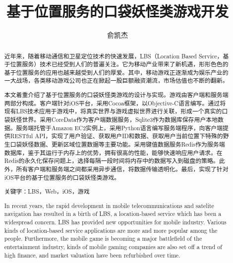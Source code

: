 \documentclass{article}
\title{基于位置服务的口袋妖怪类游戏开发}
\author{俞凯杰}
\begin{document}
\begin{CJK}{UTF8}{gbsn}
  \maketitle

  \renewcommand{\abstractname}{摘要}
	\renewcommand{\figurename}{图}
	\renewcommand{\refname}{参考文献}

	

  \begin{abstract}
    近年来，随着移动通信和卫星定位技术的快速发展，LBS（Location Based Service，基于位置服务）技术已经受到人们的普遍关注。它为移动产业带来了新机遇，形形色色的基于位置服务的应用也越来越受到人们的厚爱。其中，移动游戏正逐渐成为娱乐产业的一大战场，各类移动游戏公司也正在掀起一股巨额融资潮流，市场估值也不断的翻新。

    本文着重介绍了基于位置服务的口袋妖怪类游戏的设计与实现。游戏由客户端和服务端两部分构成。客户端针对iOS平台，采用Cocoa框架，以Objective-C语言编写。通过将现有LBS技术应用于游戏中，将真实世界与游戏虚拟世界进行关联，形成一个真实的口袋妖怪世界。采用CoreData作为客户端数据服务，Sqlite3作为数据库保存用户本地数据。服务端托管于Amazon EC2实例上，采用Python语言编写服务端程序，向客户端提供RESTful API，实现了用户验证、获取用户ID和数据、获取用户当前位置下特殊的野生口袋妖怪数据、更新区域位置数据等主要功能。采用键值数据服务Redis作为服务端数据库，鉴于其运行于内存上的优势，拥有很高的性能，能够快速响应用户请求。在Redis的永久化保存问题上，选择每隔一段时间将内存中的数据写入到磁盘的策略。此外，所有客户端和服务端之间都采用异步通信，将数据传输透明化。最后，实现了针对iOS平台的基于位置服务的口袋妖怪类游戏。

    关键字：LBS，Web，iOS，游戏
    
  \end{abstract}

  \begin{abstract}
    In recent years, the rapid development in mobile telecommunications and satelite navigation has resulted in a birth of LBS, a location-based service which has been a widespread concern. LBS has provided new opportunities for mobile industry. Various kinds of location-based service applications are more and more popular among the people. Furthermore, the mobile game is becoming a major battlefield of the entertainment industry, kinds of mobile gaming companies are also set off a trend of high finance, and market valuation have been refurbished over time.


\end{abstract}
\end{CJK}
\end{document}
